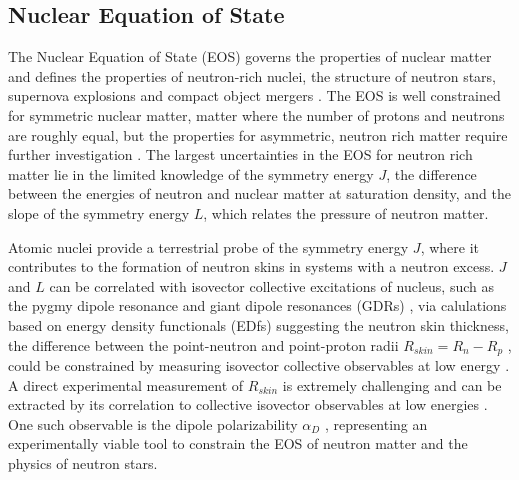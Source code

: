 \documentclass[cnatzke_thesis_proposal.tex]{subfiles}
\begin{document}
\subsection{Nuclear Equation of State}
The Nuclear Equation of State (EOS) governs the properties of nuclear matter and defines the properties of neutron-rich nuclei, the structure of neutron stars, supernova explosions and compact object mergers \cite{knupfer_scaling_1985}. 
The EOS is well constrained for symmetric nuclear matter, matter where the number of protons and neutrons are roughly equal, but the properties for asymmetric, neutron rich matter require further investigation \cite{danielewicz_determination_2002}.
The largest uncertainties in the EOS for neutron rich matter lie in the limited knowledge of the symmetry energy $J$, the difference between the energies of neutron and nuclear matter at saturation density, and the slope of the symmetry energy $L$, which relates the pressure of neutron matter. 


Atomic nuclei provide a terrestrial probe of the symmetry energy $J$, where it contributes to the formation of neutron skins in systems with a neutron excess. 
$J$ and $L$ can be correlated with isovector collective excitations of nucleus, such as the pygmy dipole resonance \cite{carbone_constraints_2010} and giant dipole resonances (GDRs) \cite{trippa_giant_2008}, via calulations based on energy density functionals (EDfs) suggesting the neutron skin thickness, the difference between the point-neutron and point-proton radii $R_{skin} = R_n - R_p$ \cite{tsang_constraints_2012}, could be constrained by measuring isovector collective observables at low energy \cite{krasznahorkay_excitation_1999}.
A direct experimental measurement of $R_{skin}$ is extremely challenging and can be extracted by its correlation to collective isovector observables at low energies \cite{birkhan_electric_2017}. 
One such observable is the dipole polarizability $\alpha_D$ \cite{birkhan_electric_2017}, representing an experimentally viable tool to constrain the EOS of neutron matter and the physics of neutron stars. 

\end{document}

